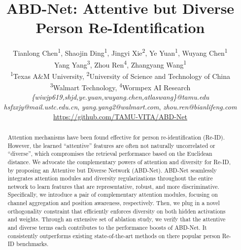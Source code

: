 \documentclass[10pt,twocolumn]{article}
\begin{document}
\thispagestyle{empty}
\title{ABD-Net: Attentive but Diverse Person Re-Identification}

\author{Tianlong Chen\textsuperscript{1}, Shaojin Ding\textsuperscript{1}\footnotemark[1] , Jingyi Xie\textsuperscript{2}\footnotemark[1] , Ye Yuan\textsuperscript{1}, Wuyang Chen\textsuperscript{1} \\ Yang Yang\textsuperscript{3}, Zhou Ren\textsuperscript{4}, Zhangyang Wang\textsuperscript{1}\\
\textsuperscript{1}Texas A\&M University, \textsuperscript{2}University of Science and Technology of China \\ \textsuperscript{3}Walmart Technology, \textsuperscript{4}Wormpex AI Research\\
\textit{\small \{wiwjp619,shjd,ye.yuan,wuyang.chen,atlaswang\}@tamu.edu}\\
\textit{\small hsfzxjy@mail.ustc.edu.cn}, 
\textit{\small yang.yang2@walmart.com}, \textit{\small zhou.ren@bianlifeng.com}\\
\url{https://github.com/TAMU-VITA/ABD-Net}
}




\maketitle



\begin{abstract}
   Attention mechanisms have been found effective for person re-identification (Re-ID). However, the learned ``attentive'' features are often not naturally uncorrelated or ``diverse'', which compromises the retrieval performance based on the Euclidean distance. We advocate the complementary powers of attention and diversity for Re-ID, by proposing an Attentive but Diverse Network (ABD-Net). ABD-Net seamlessly integrates attention modules and diversity regularizations throughout the entire network to learn features that are representative, robust, and more discriminative. Specifically, we introduce a pair of complementary attention modules, focusing on channel aggregation and position awareness, respectively. Then, we plug in a novel orthogonality constraint that efficiently enforces diversity on both hidden activations and weights. Through an extensive set of ablation study, we verify that the attentive and diverse terms each contributes to the performance boosts of ABD-Net. It consistently outperforms existing state-of-the-art methods on there popular person Re-ID benchmarks.
   
\end{abstract}
\vspace{-5mm}
\end{document}
